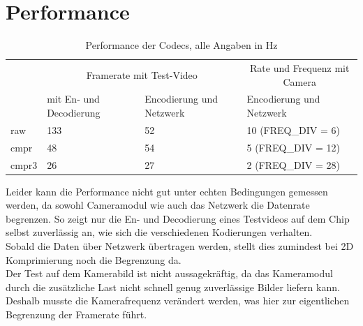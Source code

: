 \section{Performance}
\begin{table}[h]
\centering
\begin{tabular}{|l|l|l|l|}
\hline
      & \multicolumn{2}{|c|}{Framerate mit Test-Video}     & \multicolumn{1}{|c|}{Rate und Frequenz mit Camera}      \\
      & mit En- und Decodierung & Encodierung und Netzwerk & Encodierung und Netzwerk \\
\hline
raw   & 133 &  52 & 10 (FREQ\_DIV = 6) \\
cmpr  &  48 &  54 & 5 (FREQ\_DIV = 12) \\
cmpr3 &  26 &  27 & 2 (FREQ\_DIV = 28) \\
\hline
\end{tabular}

\caption{Performance der Codecs, alle Angaben in Hz}
\end{table}

Leider kann die Performance nicht gut unter echten Bedingungen gemessen werden, 
da sowohl Cameramodul wie auch das Netzwerk die Datenrate begrenzen.
So zeigt nur die En- und Decodierung eines Testvideos auf dem Chip selbst zuverlässig an, wie sich die verschiedenen Kodierungen verhalten.
\\Sobald die Daten über Netzwerk übertragen werden, stellt dies zumindest bei
2D Komprimierung noch die Begrenzung da.
\\Der Test auf dem Kamerabild ist nicht aussagekräftig, 
da das Kameramodul durch die zusätzliche Last nicht schnell genug zuverlässige Bilder liefern kann. Deshalb musste die Kamerafrequenz verändert werden, was hier zur eigentlichen Begrenzung der Framerate führt.



